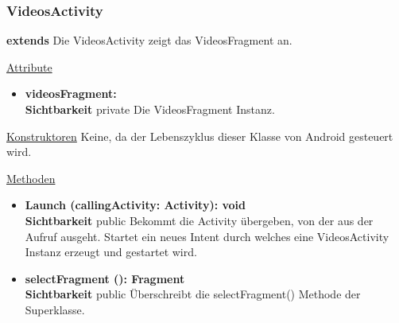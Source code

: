 \subsubsection{VideosActivity} \label{app:klasse:VideosActivity}
\textbf{extends}  \newline
Die VideosActivity zeigt das VideosFragment an.
\newline

\underline{Attribute}
\begin{itemize}
\itemsep0pt
\item \textbf{videosFragment: } \hfill\\ 
\textbf{Sichtbarkeit} private\newline
Die VideosFragment Instanz.

\end{itemize}

\underline{Konstruktoren}\newline
\indent Keine, da der Lebenszyklus dieser Klasse von Android gesteuert wird.\newline

\underline{Methoden}
\begin{itemize}
\itemsep0pt

\item \textbf{Launch (callingActivity: Activity): void}\hfill\\
\textbf{Sichtbarkeit} public\newline
Bekommt die Activity übergeben, von der aus der Aufruf ausgeht. Startet ein neues Intent durch welches eine VideosActivity Instanz erzeugt und gestartet wird.

\item \textbf{selectFragment (): Fragment}\hfill\\
\textbf{Sichtbarkeit} public\newline
Überschreibt die selectFragment() Methode der Superklasse.

\end{itemize}